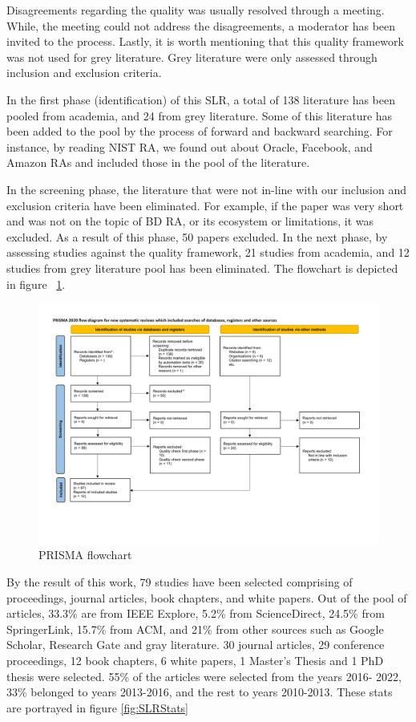 \documentclass{ieeeaccess}
\begin{document}
Disagreements regarding the quality was usually resolved through a meeting. While, the meeting could not address the disagreements, a moderator has been invited to the process. Lastly, it is worth mentioning that this quality framework was not used for grey literature. Grey literature were only assessed through inclusion and exclusion criteria. 

In the first phase (identification) of this SLR, a total of 138 literature has been pooled from academia, and 24 from grey literature. Some of this literature has been added to the pool by the process of forward and backward searching. For instance, by reading NIST RA, we found out about Oracle, Facebook, and Amazon RAs and included those in the pool of the literature.

In the screening phase, the literature that were not in-line with our inclusion and exclusion criteria have been eliminated. For example, if the paper was very short and was not on the topic of BD RA, or its ecosystem or limitations, it was excluded. As a result of this phase, 50 papers excluded. In the next phase, by assessing studies against the quality framework, 21 studies from academia, and 12 studies from grey literature pool has been eliminated. The flowchart is depicted in figure ~\ref{fig:PRISMA}.


\begin{figure}[t]
    \includegraphics[width=18cm]{PRISMA/PRISMA_Flow_Diagram-2.pdf}
    \caption{PRISMA flowchart}
    \label{fig:PRISMA}
\end{figure}


By the result of this work, 79 studies have been selected comprising of proceedings, journal articles, book chapters, and white papers. Out of the pool of articles, 33.3\% are from IEEE Explore, 5.2\% from ScienceDirect, 24.5\% from SpringerLink, 15.7\% from ACM, and 21\% from other sources such as Google Scholar, Research Gate and gray literature. 30 journal articles, 29 conference proceedings, 12 book chapters, 6 white papers, 1 Master’s Thesis and 1 PhD thesis were selected. 55\% of the articles were selected from the years 2016- 2022, 33\% belonged to years 2013-2016, and the rest to years 2010-2013. These stats are portrayed in figure \ref{fig:SLRStats}
\end{document}
